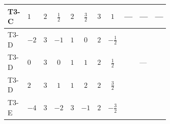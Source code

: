 \documentclass[8pt]{article}
\begin{document}
\begin{landscape}
\begin{longtable}{@{}llcccccc >{\raggedright\arraybackslash}p{0.21\linewidth} >{\raggedright\arraybackslash}p{0.21\linewidth} >{\raggedright\arraybackslash}p{0.21\linewidth}@{}}
\midrule
T3-C & $1$ & $2$ & $\frac{1}{2}$ & $2$ & $\frac{3}{2}$ & $3$ & $1$ & --- & --- & --- \\
\midrule
T3-D & $-2$ & $3$ & $-1$ & $1$ & $0$ & $2$ & $-\frac{1}{2}$ & \scriptsize\adjustbox{max width=\linewidth}{$\begin{gathered} +21 {g_2}^4\end{gathered}$} & \scriptsize\adjustbox{max width=\linewidth}{$\begin{gathered} +{g_1}^2 \left(12 {g_2}^2-12 {\lambda_{S_1}^{(1)}}-6 {\lambda_{S_1}^{(A)}}\right)\end{gathered}$} & \scriptsize\adjustbox{max width=\linewidth}{$\begin{gathered} +{g_2}^2 (-24 {\lambda_{S_1}^{(1)}}-12 {\lambda_{S_1}^{(A)}})\end{gathered}$} \\
\midrule
T3-D & $0$ & $3$ & $0$ & $1$ & $1$ & $2$ & $\frac{1}{2}$ & \scriptsize\adjustbox{max width=\linewidth}{$\begin{gathered} +21 {g_2}^4\end{gathered}$} & --- & \scriptsize\adjustbox{max width=\linewidth}{$\begin{gathered} +{g_2}^2 (-24 {\lambda_{S_1}^{(1)}}-12 {\lambda_{S_1}^{(A)}})\end{gathered}$} \\
\midrule
T3-D & $2$ & $3$ & $1$ & $1$ & $2$ & $2$ & $\frac{3}{2}$ & \scriptsize\adjustbox{max width=\linewidth}{$\begin{gathered} +21 {g_2}^4\end{gathered}$} & \scriptsize\adjustbox{max width=\linewidth}{$\begin{gathered} +{g_1}^2 \left(12 {g_2}^2-12 {\lambda_{S_1}^{(1)}}-6 {\lambda_{S_1}^{(A)}}\right)\end{gathered}$} & \scriptsize\adjustbox{max width=\linewidth}{$\begin{gathered} +{g_2}^2 (-24 {\lambda_{S_1}^{(1)}}-12 {\lambda_{S_1}^{(A)}})\end{gathered}$} \\
\midrule
T3-E & $-4$ & $3$ & $-2$ & $3$ & $-1$ & $2$ & $-\frac{3}{2}$ & \scriptsize\adjustbox{max width=\linewidth}{$\begin{gathered} +21 {g_2}^4\end{gathered}$} & \scriptsize\adjustbox{max width=\linewidth}{$\begin{gathered} +{g_1}^2 \left(48 {g_2}^2-48 {\lambda_{S_1}^{(1)}}-24 {\lambda_{S_1}^{(A)}}\right)\end{gathered}$} & \scriptsize\adjustbox{max width=\linewidth}{$\begin{gathered} +{g_2}^2 (-24 {\lambda_{S_1}^{(1)}}-12 {\lambda_{S_1}^{(A)}})\end{gathered}$} \\

\end{longtable}
\end{landscape}
\end{document}
